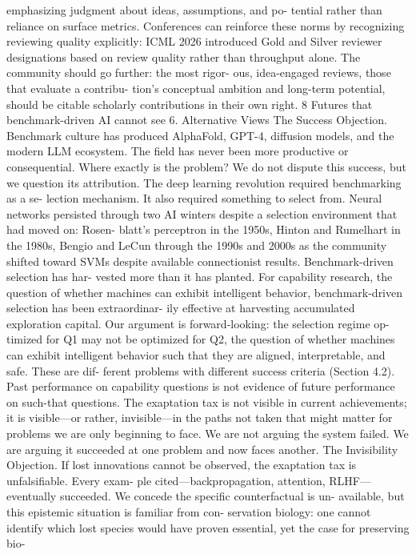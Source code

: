 emphasizing judgment about ideas, assumptions, and po-
tential rather than reliance on surface metrics. Conferences
can reinforce these norms by recognizing reviewing quality
explicitly: ICML 2026 introduced Gold and Silver reviewer
designations based on review quality rather than throughput
alone. The community should go further: the most rigor-
ous, idea-engaged reviews, those that evaluate a contribu-
tion’s conceptual ambition and long-term potential, should
be citable scholarly contributions in their own right.
8
Futures that benchmark-driven AI cannot see
6. Alternative Views
The Success Objection. Benchmark culture has produced
AlphaFold, GPT-4, diffusion models, and the modern LLM
ecosystem. The field has never been more productive or
consequential. Where exactly is the problem? We do not
dispute this success, but we question its attribution. The
deep learning revolution required benchmarking as a se-
lection mechanism. It also required something to select
from. Neural networks persisted through two AI winters
despite a selection environment that had moved on: Rosen-
blatt’s perceptron in the 1950s, Hinton and Rumelhart in
the 1980s, Bengio and LeCun through the 1990s and 2000s
as the community shifted toward SVMs despite available
connectionist results. Benchmark-driven selection has har-
vested more than it has planted. For capability research,
the question of whether machines can exhibit intelligent
behavior, benchmark-driven selection has been extraordinar-
ily effective at harvesting accumulated exploration capital.
Our argument is forward-looking: the selection regime op-
timized for Q1 may not be optimized for Q2, the question
of whether machines can exhibit intelligent behavior such
that they are aligned, interpretable, and safe. These are dif-
ferent problems with different success criteria (Section 4.2).
Past performance on capability questions is not evidence of
future performance on such-that questions. The exaptation
tax is not visible in current achievements; it is visible—or
rather, invisible—in the paths not taken that might matter
for problems we are only beginning to face. We are not
arguing the system failed. We are arguing it succeeded at
one problem and now faces another.
The Invisibility Objection. If lost innovations cannot be
observed, the exaptation tax is unfalsifiable. Every exam-
ple cited—backpropagation, attention, RLHF—eventually
succeeded. We concede the specific counterfactual is un-
available, but this epistemic situation is familiar from con-
servation biology: one cannot identify which lost species
would have proven essential, yet the case for preserving bio-
